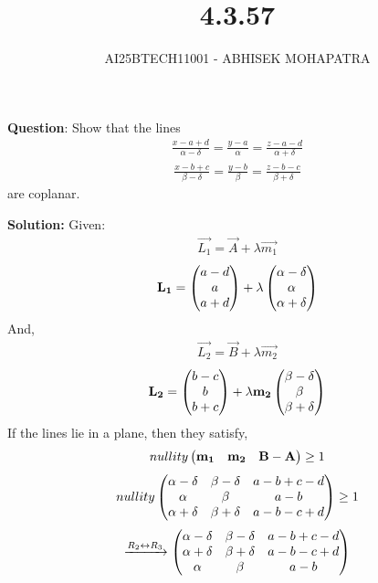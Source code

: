 \documentclass{beamer}
\title{4.3.57}
\author{AI25BTECH11001 - ABHISEK MOHAPATRA}
\numberwithin{equation}{section}
\begin{document}
{\let\newpage\relax\maketitle}
\renewcommand{\thefigure}{\theenumi}
\renewcommand{\thetable}{\theenumi}


	 	\textbf{Question}:
		Show that the lines
		\begin{align}
		\frac{x-a+d}{\alpha-\delta}=\frac{y-a}{\alpha}=\frac{z-a-d}{\alpha+\delta}
		\end{align}
		\begin{align}
		\frac{x-b+c}{\beta-\delta}=\frac{y-b}{\beta}=\frac{z-b-c}{\beta+\delta}
		\end{align}
are coplanar.
		

		\textbf{Solution:}
		Given:
		\begin{align}
				\vec{L_1} = \vec{A} + \lambda\vec{m_1}
		\end{align}
		\begin{align}
				\mathbf{L_1} = \begin{pmatrix}a-d \\a\\a+d\end{pmatrix} + \lambda
				\begin{pmatrix}\alpha - \delta\\\alpha\\\alpha + \delta \end{pmatrix}
		\end{align}And,
		\begin{align}
				\vec{L_2} = \vec{B} + \lambda\vec{m_2}
		\end{align}
		\begin{align}
				\mathbf{L_2} = \begin{pmatrix}b-c\\b\\b+c\end{pmatrix} + \lambda\mathbf{m_2}
				\begin{pmatrix}\beta - \delta\\\beta\\\beta + \delta \end{pmatrix}
		\end{align}
		If the lines lie in a plane, then they satisfy,
		\begin{align}
				nullity\begin{pmatrix}\mathbf{m_1}&\mathbf{m_2}&\mathbf{B-A}\end{pmatrix}\geq 1
		\end{align}
		\begin{align}
				nullity\begin{pmatrix}
						\alpha - \delta & \beta -\delta & a-b+c-d \\
						\alpha & \beta & a-b \\
						\alpha + \delta & \beta +\delta & a-b-c+d
				\end{pmatrix}\geq 1
		\end{align}
		\begin{align}
				\xrightarrow[]{R_2\leftrightarrow R_3}\begin{pmatrix}
						\alpha - \delta & \beta -\delta & a-b+c-d \\
						\alpha + \delta & \beta +\delta & a-b-c+d\\
						\alpha & \beta & a-b 
				\end{pmatrix}
		\end{align}
\end{document}
